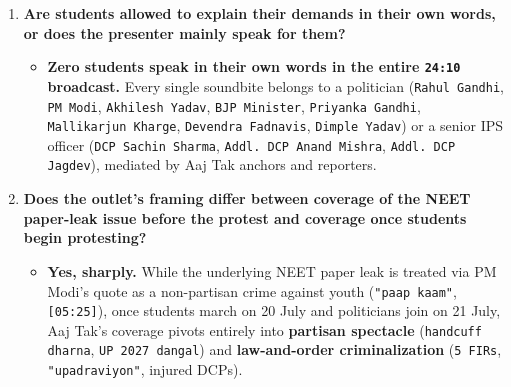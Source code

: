 \documentclass[10pt,a4paper]{article}
\begin{document}
\begin{enumerate}[leftmargin=1.6em, itemsep=4pt, topsep=4pt]
  \item \textbf{Are students allowed to explain their demands in their own words, or does the presenter mainly speak for them?}
  \begin{itemize}[leftmargin=1.4em, itemsep=2pt, topsep=2pt]
    \item \textbf{Zero students speak in their own words in the entire \texttt{24:10} broadcast.} Every single soundbite belongs to a politician (\texttt{Rahul Gandhi}, \texttt{PM Modi}, \texttt{Akhilesh Yadav}, \texttt{BJP Minister}, \texttt{Priyanka Gandhi}, \texttt{Mallikarjun Kharge}, \texttt{Devendra Fadnavis}, \texttt{Dimple Yadav}) or a senior IPS officer (\texttt{DCP Sachin Sharma}, \texttt{Addl. DCP Anand Mishra}, \texttt{Addl. DCP Jagdev}), mediated by Aaj Tak anchors and reporters.
  \end{itemize}
  \item \textbf{Does the outlet's framing differ between coverage of the NEET paper-leak issue before the protest and coverage once students begin protesting?}
  \begin{itemize}[leftmargin=1.4em, itemsep=2pt, topsep=2pt]
    \item \textbf{Yes, sharply.} While the underlying NEET paper leak is treated via PM Modi's quote as a non-partisan crime against youth (\texttt{"paap kaam"}, \texttt{[05:25]}), once students march on 20 July and politicians join on 21 July, Aaj Tak's coverage pivots entirely into \textbf{partisan spectacle} (\texttt{handcuff dharna}, \texttt{UP 2027 dangal}) and \textbf{law-and-order criminalization} (\texttt{5 FIRs}, \texttt{"upadraviyon"}, injured DCPs).
  \end{itemize}
\end{enumerate}
\end{document}
